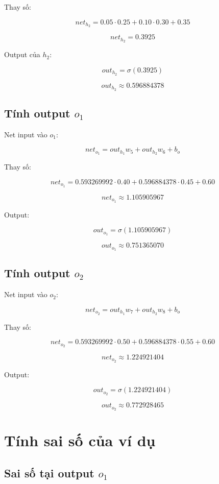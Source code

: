 \documentclass[12pt,a4paper]{report}
\begin{document}
Thay số:

\[
    net_{h_2}
    =
    0.05\cdot 0.25
    +
    0.10\cdot 0.30
    +
    0.35
\]

\[
    net_{h_2}=0.3925
\]

Output của $h_2$:

\[
    out_{h_2}=\sigma(0.3925)
\]

\[
    out_{h_2}\approx 0.596884378
\]

\section{Tính output $o_1$}

Net input vào $o_1$:

\[
    net_{o_1}=out_{h_1}w_5+out_{h_2}w_6+b_o
\]

Thay số:

\[
    net_{o_1}
    =
    0.593269992\cdot 0.40
    +
    0.596884378\cdot 0.45
    +
    0.60
\]

\[
    net_{o_1}\approx 1.105905967
\]

Output:

\[
    out_{o_1}=\sigma(1.105905967)
\]

\[
    out_{o_1}\approx 0.751365070
\]

\section{Tính output $o_2$}

Net input vào $o_2$:

\[
    net_{o_2}=out_{h_1}w_7+out_{h_2}w_8+b_o
\]

Thay số:

\[
    net_{o_2}
    =
    0.593269992\cdot 0.50
    +
    0.596884378\cdot 0.55
    +
    0.60
\]

\[
    net_{o_2}\approx 1.224921404
\]

Output:

\[
    out_{o_2}=\sigma(1.224921404)
\]

\[
    out_{o_2}\approx 0.772928465
\]

\chapter{Tính sai số của ví dụ}

\section{Sai số tại output $o_1$}
\end{document}
